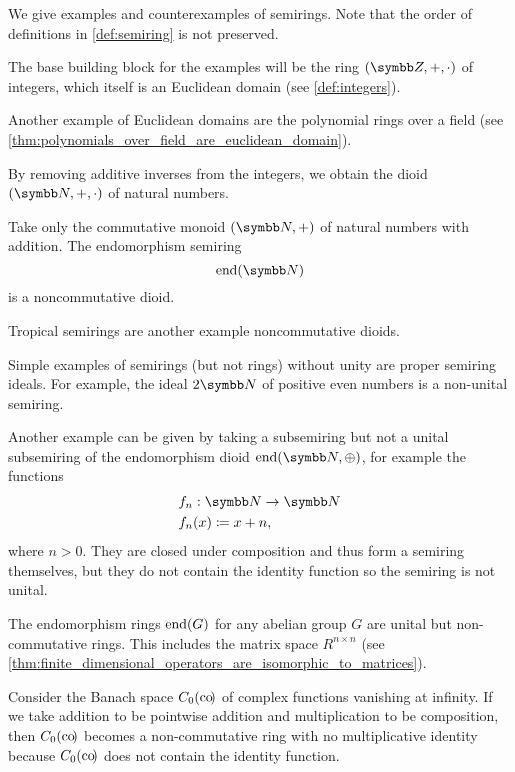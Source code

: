 \begin{example}\label{ex:semirings}
  We give examples and counterexamples of semirings. Note that the order of definitions in \cref{def:semiring} is not preserved.

  \begin{description}
     The base building block for the examples will be the ring \( (\Z, +, \cdot) \) of integers, which itself is an Euclidean domain (see \cref{def:integers}).

    Another example of Euclidean domains are the polynomial rings over a field (see \cref{thm:polynomials_over_field_are_euclidean_domain}).

     By removing additive inverses from the integers, we obtain the dioid \( (\N, +, \cdot) \) of natural numbers.

    Take only the commutative monoid \( (\N, +) \) of natural numbers with addition. The endomorphism semiring
    \begin{equation*}
      \End(\N)
    \end{equation*}
    is a noncommutative dioid.

    Tropical semirings are another example noncommutative dioids.

     Simple examples of semirings (but not rings) without unity are proper semiring ideals. For example, the ideal \( 2\N \) of positive even numbers is a non-unital semiring.

    Another example can be given by taking a subsemiring but not a unital subsemiring of the endomorphism dioid \( \End(\N, \oplus) \), for example the functions
    \begin{align*}
      &f_n: \N \to \N \\
      &f_n(x) \coloneqq x + n,
    \end{align*}
    where \( n > 0 \). They are closed under composition and thus form a semiring themselves, but they do not contain the identity function so the semiring is not unital.

     The endomorphism rings \( \operatorname{end}(G) \) for any abelian group \( G \) are unital but non-commutative rings. This includes the matrix space \( R^{n \times n} \) (see \cref{thm:finite_dimensional_operators_are_isomorphic_to_matrices}).

     Consider the Banach space \( C_0(\operatorname{co}\!) \) of complex functions vanishing at infinity. If we take addition to be pointwise addition and multiplication to be composition, then \( C_0(\operatorname{co}\!) \) becomes a non-commutative ring with no multiplicative identity because \( C_0(\operatorname{co}\!) \) does not contain the identity function.


\end{description}
\end{example}
